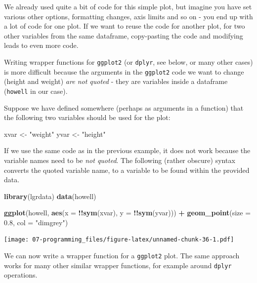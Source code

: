 \documentclass[]{book}
\newenvironment{Shaded}{\begin{snugshade}}{\end{snugshade}}
\newcommand{\DataTypeTok}[1]{\textcolor[rgb]{0.13,0.29,0.53}{#1}}
\newcommand{\FloatTok}[1]{\textcolor[rgb]{0.00,0.00,0.81}{#1}}
\newcommand{\KeywordTok}[1]{\textcolor[rgb]{0.13,0.29,0.53}{\textbf{#1}}}
\newcommand{\NormalTok}[1]{#1}
\newcommand{\OperatorTok}[1]{\textcolor[rgb]{0.81,0.36,0.00}{\textbf{#1}}}
\newcommand{\StringTok}[1]{\textcolor[rgb]{0.31,0.60,0.02}{#1}}
\begin{document}
We already used quite a bit of code for this simple plot, but imagine you have set various other options, formatting changes, axis limits and so on - you end up with a lot of code for one plot. If we want to reuse the code for another plot, for two other variables from the same dataframe, copy-pasting the code and modifying leads to even more code.

Writing wrapper functions for \texttt{ggplot2} (or \texttt{dplyr}, see below, or many other cases) is more difficult because the arguments in the \texttt{ggplot2} code we want to change (height and weight) \emph{are not quoted} - they are variables inside a dataframe (\texttt{howell} in our case).

Suppose we have defined somewhere (perhaps as arguments in a function) that the following two variables should be used for the plot:

\begin{Shaded}
\begin{Highlighting}[]
\NormalTok{xvar <-}\StringTok{ "weight"}
\NormalTok{yvar <-}\StringTok{ "height"}
\end{Highlighting}
\end{Shaded}

If we use the same code as in the previous example, it does not work because the variable names need to be \emph{not quoted}. The following (rather obscure) syntax converts the quoted variable name, to a variable to be found within the provided data.

\begin{Shaded}
\begin{Highlighting}[]
\KeywordTok{library}\NormalTok{(lgrdata)}
\KeywordTok{data}\NormalTok{(howell)}

\KeywordTok{ggplot}\NormalTok{(howell, }\KeywordTok{aes}\NormalTok{(}\DataTypeTok{x =} \OperatorTok{!!}\KeywordTok{sym}\NormalTok{(xvar), }\DataTypeTok{y =} \OperatorTok{!!}\KeywordTok{sym}\NormalTok{(yvar))) }\OperatorTok{+}
\KeywordTok{geom_point}\NormalTok{(}\DataTypeTok{size =} \FloatTok{0.8}\NormalTok{, }\DataTypeTok{col =} \StringTok{"dimgrey"}\NormalTok{)}
\end{Highlighting}
\end{Shaded}

\texttt{[image: 07-programming\_files/figure-latex/unnamed-chunk-36-1.pdf]}

We can now write a wrapper function for a \texttt{ggplot2} plot. The same approach works for many other similar wrapper functions, for example around \texttt{dplyr} operations.
\end{document}
